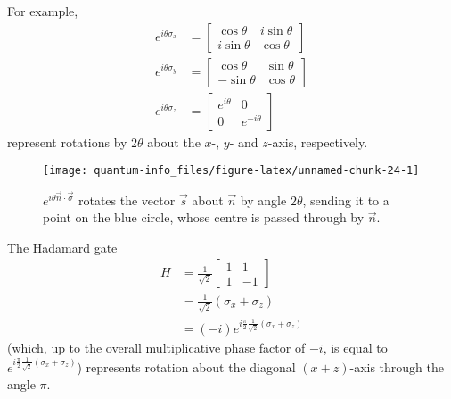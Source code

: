 \documentclass[fleqn]{article}
\begin{document}
For example,
\[
  \begin{aligned}
    e^{i\theta\sigma_x}
    &=
    \begin{bmatrix}
      \cos\theta & i\sin\theta
    \\i\sin\theta & \cos\theta
    \end{bmatrix}
  \\e^{i\theta\sigma_y}
    &=
    \begin{bmatrix}
      \cos\theta & \sin\theta
    \\-\sin\theta & \cos\theta
    \end{bmatrix}
  \\e^{i\theta\sigma_z}
    &= \begin{bmatrix}e^{i\theta}&0\\0&e^{-i\theta}\end{bmatrix}
  \end{aligned}
\]
represent rotations by \(2\theta\) about the \(x\)-, \(y\)- and \(z\)-axis, respectively.



\begin{figure}[H]

{\centering \texttt{[image: quantum-info\_files/figure-latex/unnamed-chunk-24-1]} 

}

\caption{\(e^{i\theta\vec{n}\cdot\vec{\sigma}}\) rotates the vector \(\vec{s}\) about \(\vec{n}\) by angle \(2\theta\), sending it to a point on the blue circle, whose centre is passed through by \(\vec{n}\).}\label{fig:unnamed-chunk-24}
\end{figure}

The Hadamard gate
\[
  \begin{aligned}
    H
    &= \frac{1}{\sqrt 2}
    \begin{bmatrix}
      1& 1
    \\1 & -1
    \end{bmatrix}
  \\&= \frac{1}{\sqrt 2}(\sigma_x + \sigma_z)
  \\&= (-i)e^{i \frac{\pi}{2} \frac{1}{\sqrt 2}(\sigma_x+\sigma_z)}
  \end{aligned}
\]
(which, up to the overall multiplicative phase factor of \(-i\), is equal to \(e^{i \frac{\pi}{2} \frac{1}{\sqrt 2}(\sigma_x+\sigma_z)}\)) represents rotation about the diagonal \((x+z)\)-axis through the angle \(\pi\).
\end{document}
